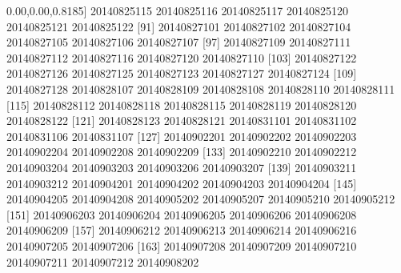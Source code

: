 \documentclass[
]{book}
\newenvironment{Shaded}{\begin{snugshade}}{\end{snugshade}}
\newcommand{\DecValTok}[1]{\textcolor[rgb]{0.00,0.00,0.81}{#1}}
\newcommand{\NormalTok}[1]{#1}
\begin{document}
\begin{Shaded}
\begin{Highlighting}[]
\NormalTok{ [}\DecValTok{85}\NormalTok{] }\DecValTok{20140825115} \DecValTok{20140825116} \DecValTok{20140825117} \DecValTok{20140825120} \DecValTok{20140825121} \DecValTok{20140825122}
\NormalTok{ [}\DecValTok{91}\NormalTok{] }\DecValTok{20140827101} \DecValTok{20140827102} \DecValTok{20140827104} \DecValTok{20140827105} \DecValTok{20140827106} \DecValTok{20140827107}
\NormalTok{ [}\DecValTok{97}\NormalTok{] }\DecValTok{20140827109} \DecValTok{20140827111} \DecValTok{20140827112} \DecValTok{20140827116} \DecValTok{20140827120} \DecValTok{20140827110}
\NormalTok{[}\DecValTok{103}\NormalTok{] }\DecValTok{20140827122} \DecValTok{20140827126} \DecValTok{20140827125} \DecValTok{20140827123} \DecValTok{20140827127} \DecValTok{20140827124}
\NormalTok{[}\DecValTok{109}\NormalTok{] }\DecValTok{20140827128} \DecValTok{20140828107} \DecValTok{20140828109} \DecValTok{20140828108} \DecValTok{20140828110} \DecValTok{20140828111}
\NormalTok{[}\DecValTok{115}\NormalTok{] }\DecValTok{20140828112} \DecValTok{20140828118} \DecValTok{20140828115} \DecValTok{20140828119} \DecValTok{20140828120} \DecValTok{20140828122}
\NormalTok{[}\DecValTok{121}\NormalTok{] }\DecValTok{20140828123} \DecValTok{20140828121} \DecValTok{20140831101} \DecValTok{20140831102} \DecValTok{20140831106} \DecValTok{20140831107}
\NormalTok{[}\DecValTok{127}\NormalTok{] }\DecValTok{20140902201} \DecValTok{20140902202} \DecValTok{20140902203} \DecValTok{20140902204} \DecValTok{20140902208} \DecValTok{20140902209}
\NormalTok{[}\DecValTok{133}\NormalTok{] }\DecValTok{20140902210} \DecValTok{20140902212} \DecValTok{20140903204} \DecValTok{20140903203} \DecValTok{20140903206} \DecValTok{20140903207}
\NormalTok{[}\DecValTok{139}\NormalTok{] }\DecValTok{20140903211} \DecValTok{20140903212} \DecValTok{20140904201} \DecValTok{20140904202} \DecValTok{20140904203} \DecValTok{20140904204}
\NormalTok{[}\DecValTok{145}\NormalTok{] }\DecValTok{20140904205} \DecValTok{20140904208} \DecValTok{20140905202} \DecValTok{20140905207} \DecValTok{20140905210} \DecValTok{20140905212}
\NormalTok{[}\DecValTok{151}\NormalTok{] }\DecValTok{20140906203} \DecValTok{20140906204} \DecValTok{20140906205} \DecValTok{20140906206} \DecValTok{20140906208} \DecValTok{20140906209}
\NormalTok{[}\DecValTok{157}\NormalTok{] }\DecValTok{20140906212} \DecValTok{20140906213} \DecValTok{20140906214} \DecValTok{20140906216} \DecValTok{20140907205} \DecValTok{20140907206}
\NormalTok{[}\DecValTok{163}\NormalTok{] }\DecValTok{20140907208} \DecValTok{20140907209} \DecValTok{20140907210} \DecValTok{20140907211} \DecValTok{20140907212} \DecValTok{20140908202}

\end{Highlighting}
\end{Shaded}
\end{document}
